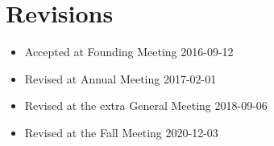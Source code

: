\section*{Revisions}

\begin{itemize}
  \item Accepted at Founding Meeting 2016-09-12
  \item Revised at Annual Meeting 2017-02-01
  \item Revised at the extra General Meeting 2018-09-06  
  \item Revised at the Fall Meeting 2020-12-03
\end{itemize}
